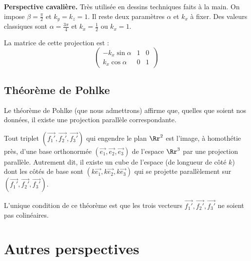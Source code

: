\documentclass[11pt,class=report,crop=false]{standalone}
\begin{document}
\textbf{Perspective cavalière.} Très utilisée en dessins techniques faits à la main.
On impose $\beta=\frac\pi2$ et $k_y=k_z=1$. Il reste deux paramètres $\alpha$ et $k_x$ à fixer. Des valeurs classiques sont $\alpha = \frac{3\pi}{4}$ et $k_x=\frac12$ ou $k_x = 1$.

\begin{center}
\begin{minipage}{0.45\textwidth}
\center
La matrice de cette projection est :
$$\begin{pmatrix}
-k_x \sin\alpha & 1 & 0 \\
k_x \cos\alpha  & 0 & 1 \
\end{pmatrix}$$
\end{minipage}\quad
\begin{minipage}{0.45\textwidth}
\end{minipage}
\end{center}



\subsection{Théorème de Pohlke}


Le théorème de Pohlke (que nous admettrons) affirme que, quelles que soient nos données, il existe une projection parallèle correspondante.

\begin{theoreme}[Pohlke]
Tout triplet $(\vec {f_1'}, \vec {f_2'}, \vec {f_3'})$ qui engendre le plan $\Rr^2$ est l'image, à homothétie près, d'une base orthonormée $(\vec {e_1},\vec {e_2},\vec {e_3})$ de l'espace $\Rr^3$ par une projection parallèle.
Autrement dit, il existe un cube de l'espace (de longueur de côté $k$) dont les côtés  de base sont $(k\vec {e_1}, k\vec {e_2}, k\vec {e_3})$ qui se projette parallèlement sur $(\vec {f_1'}, \vec {f_2'}, \vec {f_3'})$.
\end{theoreme}

L'unique condition de ce théorème est que les trois vecteurs $\vec {f_1'},\vec {f_2'},\vec {f_3'}$ ne soient pas colinéaires.


\section{Autres perspectives}
\end{document}
